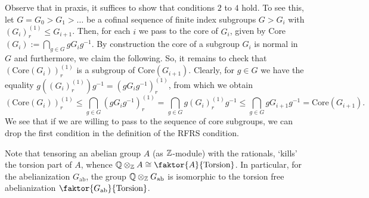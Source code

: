 Observe that in praxis, it suffices to show that conditions \(2\) to \(4\) hold. %
To see this, let \(G = G_0 > G_1 > \ldots\) be a cofinal sequence of finite index subgroups \(G > G_i\) with \((G_i)_r^{(1)} \leq G_{i+1}\).
Then, for each \(i\) we pass to the core of \(G_i\), given by Core\((G_i) := \bigcap_{g \in G} g G_i g^{-1}\).
By construction the core of a subgroup \(G_i\) is normal in \(G\) and furthermore, we claim the following.
So, it remains to check that \((\text{Core}(G_i))_r^{(1)}\) is a subgroup of Core\((G_{i+1})\).
Clearly,  for \(g \in G\) we have the equality \(g((G_i)_r^{(1)})g^{-1} = (gG_ig^{-1})_r^{(1)}\), from which we obtain
\[(\text{Core}(G_i))_r^{(1)} \leq \bigcap_{g \in G} (gG_ig^{-1})_r^{(1)} = \bigcap_{g \in G} g(G_i)_r^{(1)}g^{-1} \leq \bigcap_{g \in G} gG_{i+1}g^{-1} = \text{Core}(G_{i+1}).\]
We see that if we are willing to pass to the sequence of core subgroups, we can drop the first condition in the definition of the RFRS condition.

\begin{remark}
    Note that tensoring an abelian group \(A\) (as \(\mathbb{Z}\)-module) with the rationals, `kills' the torsion part of \(A\), whence \(\Q \otimes_\Z A \cong \faktor{A}{\text{Torsion}}\).
    In particular, for the abelianization \(G_{\text{ab}}\), the group \(\mathbb{Q} \otimes_{\mathbb{Z}} G_{\text{ab}}\) is isomorphic to the torsion free abelianization \(\faktor{G_{\text{ab}}}{\text{Torsion}}\).
\end{remark}



